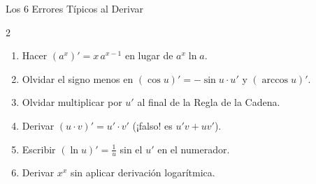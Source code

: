\documentclass[10pt,a4paper]{article}
\begin{document}
\begin{trampabox}{Los 6 Errores Típicos al Derivar}
\footnotesize
\begin{multicols}{2}
\begin{enumerate}\itemsep 1.5pt
  \item Hacer $(a^x)' = x\,a^{x-1}$ en lugar de $a^x \ln a$.
  \item Olvidar el signo menos en $(\cos u)' = -\sin u \cdot u'$ y $(\arccos u)'$.
  \item Olvidar multiplicar por $u'$ al final de la Regla de la Cadena.
  \item Derivar $(u\cdot v)' = u'\cdot v'$ (¡falso! es $u'v + uv'$).
  \item Escribir $(\ln u)' = \frac{1}{u}$ sin el $u'$ en el numerador.
  \item Derivar $x^x$ sin aplicar derivación logarítmica.
\end{enumerate}
\end{multicols}
\end{trampabox}
\end{document}
